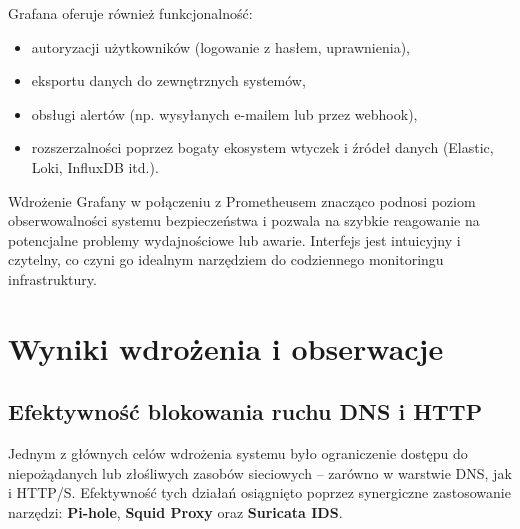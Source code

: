 \documentclass[
    left=2.5cm,         %
    right=2.5cm,        %
    top=2.5cm,          %
    bottom=3cm,         %
    bindingoffset=6mm,  %
    nohyphenation=true %
]{eiti/eiti-thesis} %
\begin{document}
Grafana oferuje również funkcjonalność:
\begin{itemize}
    \item autoryzacji użytkowników (logowanie z hasłem, uprawnienia),
    \item eksportu danych do zewnętrznych systemów,
    \item obsługi alertów (np. wysyłanych e-mailem lub przez webhook),
    \item rozszerzalności poprzez bogaty ekosystem wtyczek i źródeł danych (Elastic, Loki, InfluxDB itd.).
\end{itemize}

Wdrożenie Grafany w połączeniu z Prometheusem znacząco podnosi poziom obserwowalności systemu bezpieczeństwa i pozwala na szybkie reagowanie na potencjalne problemy wydajnościowe lub awarie. Interfejs jest intuicyjny i czytelny, co czyni go idealnym narzędziem do codziennego monitoringu infrastruktury.

\section{ Wyniki wdrożenia i obserwacje}
\subsection{Efektywność blokowania ruchu DNS i HTTP}

Jednym z głównych celów wdrożenia systemu było ograniczenie dostępu do niepożądanych lub złośliwych zasobów sieciowych – zarówno w warstwie DNS, jak i HTTP/S. Efektywność tych działań osiągnięto poprzez synergiczne zastosowanie narzędzi: \textbf{Pi-hole}, \textbf{Squid Proxy} oraz \textbf{Suricata IDS}.
\end{document}
